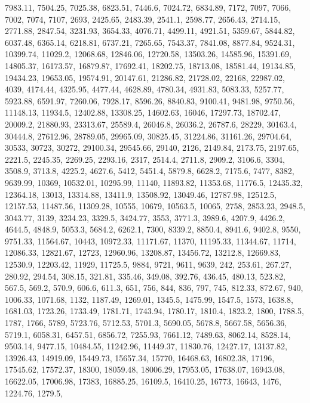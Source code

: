 \documentclass[
]{article}
\begin{document}
7983.11, 7504.25, 7025.38, 6823.51, 7446.6, 7024.72, 6834.89, 7172,
7097, 7066, 7002, 7074, 7107, 2693, 2425.65, 2483.39, 2541.1, 2598.77,
2656.43, 2714.15, 2771.88, 2847.54, 3231.93, 3654.33, 4076.71, 4499.11,
4921.51, 5359.67, 5844.82, 6037.48, 6365.14, 6218.81, 6737.21, 7265.65,
7543.37, 7841.08, 8877.84, 9524.31, 10399.74, 11029.2, 12068.68,
12846.06, 12720.58, 13503.26, 14585.96, 15391.69, 14805.37, 16173.57,
16879.87, 17692.41, 18202.75, 18713.08, 18581.44, 19134.85, 19434.23,
19653.05, 19574.91, 20147.61, 21286.82, 21728.02, 22168, 22987.02, 4039,
4174.44, 4325.95, 4477.44, 4628.89, 4780.34, 4931.83, 5083.33, 5257.77,
5923.88, 6591.97, 7260.06, 7928.17, 8596.26, 8840.83, 9100.41, 9481.98,
9750.56, 11148.13, 11934.5, 12402.88, 13308.25, 14602.63, 16046,
17297.73, 18702.47, 20009.2, 21880.93, 23313.67, 25589.4, 26046.8,
26036.2, 26787.6, 28229, 30163.4, 30444.8, 27612.96, 28789.05, 29965.09,
30825.45, 31224.86, 31161.26, 29704.64, 30533, 30723, 30272, 29100.34,
29545.66, 29140, 2126, 2149.84, 2173.75, 2197.65, 2221.5, 2245.35,
2269.25, 2293.16, 2317, 2514.4, 2711.8, 2909.2, 3106.6, 3304, 3508.9,
3713.8, 4225.2, 4627.6, 5412, 5451.4, 5879.8, 6628.2, 7175.6, 7477,
8382, 9639.99, 10369, 10532.01, 10295.99, 11140, 11893.82, 11353.68,
11776.5, 12435.32, 12364.18, 13013, 13314.88, 13411.9, 13508.92,
13049.46, 12787.98, 12512.5, 12157.53, 11487.56, 11309.28, 10555, 10679,
10563.5, 10065, 2758, 2853.23, 2948.5, 3043.77, 3139, 3234.23, 3329.5,
3424.77, 3553, 3771.3, 3989.6, 4207.9, 4426.2, 4644.5, 4848.9, 5053.3,
5684.2, 6262.1, 7300, 8339.2, 8850.4, 8941.6, 9402.8, 9550, 9751.33,
11564.67, 10443, 10972.33, 11171.67, 11370, 11195.33, 11344.67, 11714,
12086.33, 12821.67, 12723, 12960.96, 13208.87, 13456.72, 13212.8,
12669.83, 12530.9, 12203.42, 11929, 11725.5, 9884, 9721, 9611, 9639,
242, 253.61, 267.27, 280.92, 294.54, 308.15, 321.81, 335.46, 349.08,
392.76, 436.45, 480.13, 523.82, 567.5, 569.2, 570.9, 606.6, 611.3, 651,
756, 844, 836, 797, 745, 812.33, 872.67, 940, 1006.33, 1071.68, 1132,
1187.49, 1269.01, 1345.5, 1475.99, 1547.5, 1573, 1638.8, 1681.03,
1723.26, 1733.49, 1781.71, 1743.94, 1780.17, 1810.4, 1823.2, 1800,
1788.5, 1787, 1766, 5789, 5723.76, 5712.53, 5701.3, 5690.05, 5678.8,
5667.58, 5656.36, 5719.1, 6058.31, 6457.51, 6856.72, 7255.93, 7661.12,
7489.63, 8062.14, 8528.14, 9503.14, 9477.15, 10484.55, 11242.96,
11449.37, 11830.76, 12427.17, 13137.82, 13926.43, 14919.09, 15449.73,
15657.34, 15770, 16468.63, 16802.38, 17196, 17545.62, 17572.37, 18300,
18059.48, 18006.29, 17953.05, 17638.07, 16943.08, 16622.05, 17006.98,
17383, 16885.25, 16109.5, 16410.25, 16773, 16643, 1476, 1224.76, 1279.5,
\end{document}
